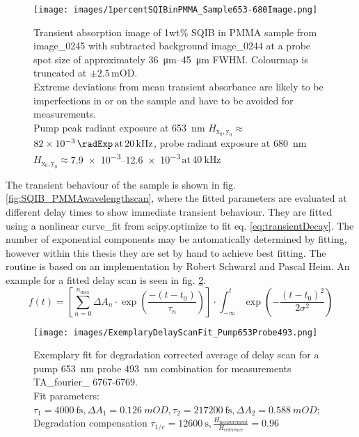 \documentclass[twoside,openright,listof=numbered]{scrreprt}
\def\pumpExp#1{\ensuremath{\SI{#1}{\radExp}\,\mathrm{at}\, \SI{20}{\kilo\hertz}}}
\def\frep#1{\ensuremath{\,\mathrm{at}\, \SI{#1}{\kilo\hertz}}}
\def\radiantExp{\ensuremath{H_\mathrm{x_0,y_0}}}
\begin{document}
\begin{figure}[hbt]
\centering
\texttt{[image: images/1percentSQIBinPMMA\_Sample653-680Image.png]}
\caption[Transient absorption image of 1wt\% SQIB in PMMA sample from image\_0245 with subtracted background image\_0244 for pump \qty{653}{\nano\meter} and probe \qty{680}{\nano\meter}.]{Transient absorption image of 1wt\% SQIB in PMMA sample from image\_0245 with subtracted background image\_0244 at a probe spot size of approximately \SIrange{36}{45}{\micro\meter} FWHM. Colourmap is truncated at $\pm2.5\,\text{mOD}$.\\ Extreme deviations from mean transient absorbance are likely to be imperfections in or on the sample and have to be avoided for measurements.\\ Pump peak radiant exposure at \SI{653}{\nano\meter} $\radiantExp\approx$ \pumpExp{82e-3}, probe radiant exposure at \SI{680}{\nano\meter} $\radiantExp\approx$\SIrange{7.9e-3}{12.6e-3}{\radExp}\frep{40} \label{fig:TA_image_sample}}
\end{figure}

The transient behaviour of the sample is shown in fig. \ref{fig:SQIB_PMMAwavelengthscan}, where the fitted parameters are evaluated at different delay times to show immediate transient behaviour. They are fitted using a nonlinear curve\_fit from scipy.optimize to fit eq. \ref{eq:transientDecay}. The number of exponential components may be automatically determined by fitting, however within this thesis they are set by hand to achieve best fitting. The routine is based on an implementation by Robert Schwarzl and Pascal Heim. An example for a fitted delay scan is seen in fig. \ref{fig:delayFitExample}.
\begin{equation}\label{eq:transientDecay}
f(t) = \left[\sum_{n=0}^{n_\text{max}} \Delta A_n\cdot \exp{\left(\frac{-(t-t_0)}{\tau_n}\right)}\right]\cdot \int_{-\infty}^t \exp \left(-\frac{(t-t_0)^2}{2\sigma^2}\right)
\end{equation}

\begin{figure}[hbtp]
\centering
\texttt{[image: images/ExemplaryDelayScanFit\_Pump653Probe493.png]}
\caption[Exemplary fit for degradation corrected average of delay scan for a pump \SI{653}{\nano\meter} probe \SI{493}{\nano\meter} combination for measurements TA\_fourier\_ 6767-6769.]{Exemplary fit for degradation corrected average of delay scan for a pump \SI{653}{\nano\meter} probe \SI{493}{\nano\meter} combination for measurements TA\_fourier\_ 6767-6769.\\Fit parameters: $\tau_1 = \SI{4000}{\femto\second}, \Delta A_1 = \SI{0.126}{mOD}, \tau_2 = \SI{217200}{\femto\second}, \Delta A_2 = \SI{0.588}{mOD}$; Degradation compensation $\tau_{1/e} = \SI{12600}{\second}, \frac{H_\mathrm{measurement}}{H_\mathrm{reference}} = 0.96$ \label{fig:delayFitExample}}
\end{figure}
\end{document}
